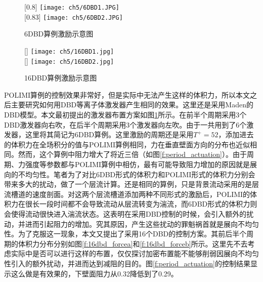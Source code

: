 \begin{figure}[htb]
  \centering
  [0.8\textwidth]
  {\texttt{[image: ch5/6DBD1.JPG]}}
  \\\bigskip
  [0.83\textwidth]
  {\texttt{[image: ch5/6DBD2.JPG]}}
  \caption{6DBD算例激励示意图}\label{f:6dbd_force}
\end{figure}
\begin{figure}[htb]
  \centering
  [\textwidth]
  {\texttt{[image: ch5/16DBD1.jpg]}}
  \\\bigskip
  [\textwidth]
  {\texttt{[image: ch5/16DBD2.jpg]}}
  \caption{16DBD算例激励示意图}\label{f:16dbd_force}
\end{figure}
POLIMI算例的控制效果非常好，但是实际中无法产生这样的体积力，所以本文之后主要研究如何用DBD等离子体激发器产生相同的效果。这里还是采用Maden的\cite{Maden2013}DBD模型。本文最初提出的激发器布置方案如图\ref{f:6dbd_force}所示。在前半个周期采用3个DBD激发器向右吹，在后半个周期采用3个激发器向左吹。由于一共用到了6个激发器，这里将其简记为6DBD算例。这里激励的周期还是采用$T^+=52$，添加进去的体积力在全场积分的值与POLIMI算例相同，力在垂直壁面方向的分布也近似相同。然而，这个算例中阻力增大了将近三倍（如图\ref{f:period_actuation}）。由于周期、力强度等参数都与POLIMI算例中相仿，最有可能导致阻力增加的原因就是展向的不均匀性。笔者为了对比6DBD形式的体积力和POLIMI形式的体积力分别会带来多大的扰动，做了一个层流计算。还是相同的算例，只是背景流动采用的是层流槽道的速度剖面。对这两个层流槽道添加两种不同形式的激励后，POLIMI的体积力在很长一段时间都不会导致流动从层流转变为湍流，而6DBD形式的体积力则会使得流动很快进入湍流状态。这表明在采用DBD控制的时候，会引入额外的扰动，并进而引起阻力的增加。究其原因，产生这些扰动的罪魁祸首就是展向不均匀性。为了克服这一现象，本文又提出了采用16个DBD的控制方案。其前后半个周期的体积力分布分别如图\ref{f:16dbd_forcea}和\ref{f:16dbd_forceb}所示。这里先不去考虑实际中是否可以进行这样的布置，仅仅探讨加密布置能不能够削弱因展向不均匀性引入的额外扰动，并进而达到减阻的目的。图\ref{f:period_actuation}的控制结果显示这么做是有效果的，下壁面阻力从0.32降低到了0.29。

